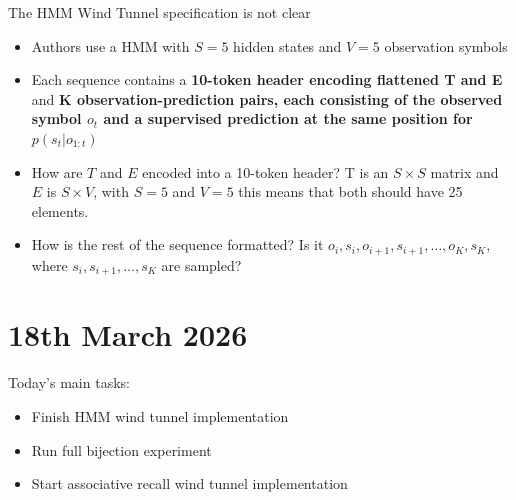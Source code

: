 \documentclass[12pt,a4paper,twoside]{article}
\begin{document}
\begin{note}
	The HMM Wind Tunnel specification is not clear
	\begin{itemize}
		\item Authors use a HMM with $S=5$ hidden states and $V=5$ observation symbols
		\item Each sequence contains a \textbf{10-token header encoding flattened T and E} and \textbf{K observation-prediction pairs, each consisting of the observed symbol $o_t$ and a supervised prediction at the same position for $p(s_t | o_{1:t})$} 
		\item How are $T$ and $E$ encoded into a 10-token header? T is an $S \times S$ matrix and $E$ is $S \times V$, with $S=5$ and $V=5$ this means that both should have 25 elements.
		\item How is the rest of the sequence formatted? Is it $o_i, s_i, o_{i+1}, s_{i+1}, \ldots, o_K, s_K$, where $s_i, s_{i+1}, \ldots, s_K$ are sampled?
	\end{itemize}
\end{note}

\section{18th March 2026}

\begin{summary}
	Today's main tasks:
	\begin{itemize}
		\item Finish HMM wind tunnel implementation
		\item Run full bijection experiment
		\item Start associative recall wind tunnel implementation
	\end{itemize}
\end{summary}
\printbibliographysection
\end{document}

